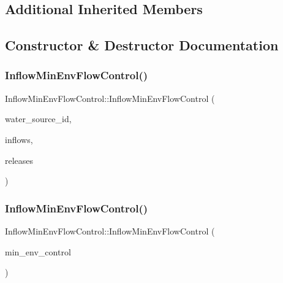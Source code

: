 \subsection*{Additional Inherited Members}


\subsection{Constructor \& Destructor Documentation}
\mbox{\label{classInflowMinEnvFlowControl_aff6c04aaa6e206b29b072aea6fb38367}} 
\subsubsection{\texorpdfstring{Inflow\+Min\+Env\+Flow\+Control()}{InflowMinEnvFlowControl()}\hspace{0.1cm}{\footnotesize\ttfamily [1/2]}}
{\footnotesize\ttfamily Inflow\+Min\+Env\+Flow\+Control\+::\+Inflow\+Min\+Env\+Flow\+Control (\begin{DoxyParamCaption}\item[{int}]{water\+\_\+source\+\_\+id,  }\item[{const vector$<$ double $>$ \&}]{inflows,  }\item[{const vector$<$ double $>$ \&}]{releases }\end{DoxyParamCaption})}

\mbox{\label{classInflowMinEnvFlowControl_a6736e6aa07a27e314789e07a9ab30cad}} 
\subsubsection{\texorpdfstring{Inflow\+Min\+Env\+Flow\+Control()}{InflowMinEnvFlowControl()}\hspace{0.1cm}{\footnotesize\ttfamily [2/2]}}
{\footnotesize\ttfamily Inflow\+Min\+Env\+Flow\+Control\+::\+Inflow\+Min\+Env\+Flow\+Control (\begin{DoxyParamCaption}\item[{const \mbox{\hyperlink{classInflowMinEnvFlowControl}{Inflow\+Min\+Env\+Flow\+Control}} \&}]{min\+\_\+env\+\_\+control }\end{DoxyParamCaption})}

